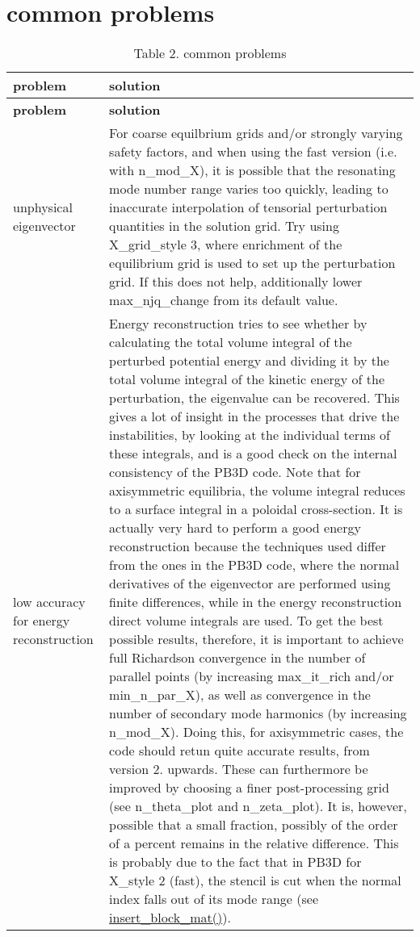 \hypertarget{page_faq_faq_problems}{}\section{common problems}\label{page_faq_faq_problems}
\hypertarget{page_faq_faq_problems_tab}{}
\tabulinesep=1mm
\begin{longtabu} spread 0pt [c]{*{2}{|X[-1]}|}
\caption{Table 2. common problems}\label{page_faq_faq_problems_tab}\\
\hline
\rowcolor{\tableheadbgcolor}\textbf{ problem }&\textbf{ solution   }\\
\endfirsthead
\hline
\endfoot
\hline
\rowcolor{\tableheadbgcolor}\textbf{ problem }&\textbf{ solution   }\\
\endhead
unphysical eigenvector &For coarse equilbrium grids and/or strongly varying safety factors, and when using the fast version (i.\+e. with {\ttfamily n\+\_\+mod\+\_\+X}), it is possible that the resonating mode number range varies too quickly, leading to inaccurate interpolation of tensorial perturbation quantities in the solution grid. Try using {\ttfamily X\+\_\+grid\+\_\+style} 3, where enrichment of the equilibrium grid is used to set up the perturbation grid. If this does not help, additionally lower {\ttfamily max\+\_\+njq\+\_\+change} from its default value.   \\
low accuracy for energy reconstruction &Energy reconstruction tries to see whether by calculating the total volume integral of the perturbed potential energy and dividing it by the total volume integral of the kinetic energy of the perturbation, the eigenvalue can be recovered. This gives a lot of insight in the processes that drive the instabilities, by looking at the individual terms of these integrals, and is a good check on the internal consistency of the P\+B3D code. Note that for axisymmetric equilibria, the volume integral reduces to a surface integral in a poloidal cross-\/section. It is actually very hard to perform a good energy reconstruction because the techniques used differ from the ones in the P\+B3D code, where the normal derivatives of the eigenvector are performed using finite differences, while in the energy reconstruction direct volume integrals are used. To get the best possible results, therefore, it is important to achieve full Richardson convergence in the number of parallel points (by increasing {\ttfamily max\+\_\+it\+\_\+rich} and/or {\ttfamily min\+\_\+n\+\_\+par\+\_\+X}), as well as convergence in the number of secondary mode harmonics (by increasing {\ttfamily n\+\_\+mod\+\_\+X}). Doing this, for axisymmetric cases, the code should retun quite accurate results, from version 2. upwards. These can furthermore be improved by choosing a finer post-\/processing grid (see {\ttfamily n\+\_\+theta\+\_\+plot} and {\ttfamily n\+\_\+zeta\+\_\+plot}). It is, however, possible that a small fraction, possibly of the order of a percent remains in the relative difference. This is probably due to the fact that in P\+B3D for {\ttfamily X\+\_\+style} 2 (fast), the stencil is cut when the normal index falls out of its mode range (see \hyperlink{namespaceslepc__utilities_aa34aa361f0bfff9621ecba179f9ed0c6}{insert\+\_\+block\+\_\+mat()}).   \\

\end{longtabu}
